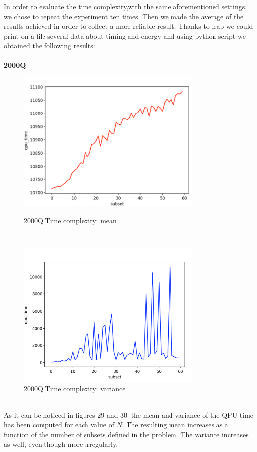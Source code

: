 \documentclass[oneside,a4paper]{article}
\begin{document}
\newpage
In order to evaluate the time complexity,with the same aforementioned settings, we chose to repeat the experiment ten times. Then we made the average of the results achieved in order to collect a more reliable result. Thanks to leap we could print on a file several data about timing and energy and using python script we obtained the following results:\\
\\
\textbf{2000Q}
\begin{figure}[htp]
\begin{minipage}[b]{7.5cm}
\centering
\includegraphics[width=9cm]{LaTeXTemplate/Images/2000QTimeComplexity.png}
\caption{2000Q Time complexity: mean}
\end{minipage}
\ \hspace{2mm} \hspace{2mm} \
\begin{minipage}[b]{9cm}
\centering
\includegraphics[width=9cm]{LaTeXTemplate/Images/2000QTimeVariance.png}
\caption{2000Q Time complexity: variance}
\end{minipage}
\end{figure}\\
As it can be noticed in figures 29 and 30, the mean and variance of the QPU time has been computed for each value of $N$. The resulting mean increases as a function of the number of subsets defined in the problem. The variance increases as well, even though more irregularly.
\end{document}
